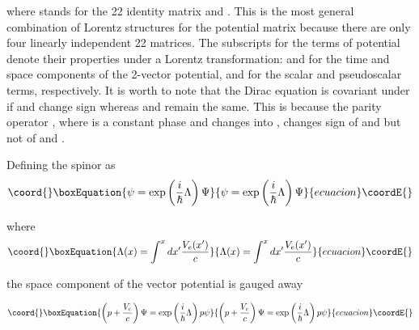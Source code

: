 \documentclass[a4paper,12pt,titlepage]{article}
\begin{document}
\noindent where \coordHE{} stands for the 2\myHighlight{$\times $}\coordHE{}2 identity matrix and \coordHE{}. This is the most general combination of Lorentz
structures for the potential matrix because there are only four linearly
independent 2\myHighlight{$\times $}\coordHE{}2 matrices. The subscripts for the terms of potential
denote their properties under a Lorentz transformation: \coordHE{} and \coordHE{} for the
time and space components of the 2-vector potential, \coordHE{} and \coordHE{} for the
scalar and pseudoscalar terms, respectively. It is worth to note that the
Dirac equation is covariant under \coordHE{} if \coordHE{} and \coordHE{} change sign whereas \coordHE{} and \coordHE{} remain the same.
This is because the parity operator \coordHE{},
where \myHighlight{$\theta $}\coordHE{} is a constant phase and \coordHE{} changes \coordHE{} into \coordHE{},
changes sign of \myHighlight{$\alpha $}\coordHE{} and \coordHE{} but not of \coordHE{} and \myHighlight{$\beta $}\coordHE{}%
.

Defining the spinor \myHighlight{$\psi $}\coordHE{} as 
\begin{equation}\coord{}\boxEquation{
\psi =\exp \left( \frac{i}{\hbar }\Lambda \right) \Psi  \label{eq5}
}{
\psi =\exp \left( \frac{i}{\hbar }\Lambda \right) \Psi  }{ecuacion}\coordE{}\end{equation}

\noindent where 
\begin{equation}\coord{}\boxEquation{
\Lambda (x)=\int^{x}dx^{\prime }\frac{V_{e}(x^{\prime })}{c}  \label{eq6}
}{
\Lambda (x)=\int^{x}dx^{\prime }\frac{V_{e}(x^{\prime })}{c}  }{ecuacion}\coordE{}\end{equation}

\noindent the space component of the vector potential is gauged away

\begin{equation}\coord{}\boxEquation{
\left( p+\frac{V_{e}}{c}\right) \Psi =\exp \left( \frac{i}{\hbar }\Lambda
\right) p\psi  \label{eq7}
}{
\left( p+\frac{V_{e}}{c}\right) \Psi =\exp \left( \frac{i}{\hbar }\Lambda
\right) p\psi  }{ecuacion}\coordE{}\end{equation}
\end{document}
